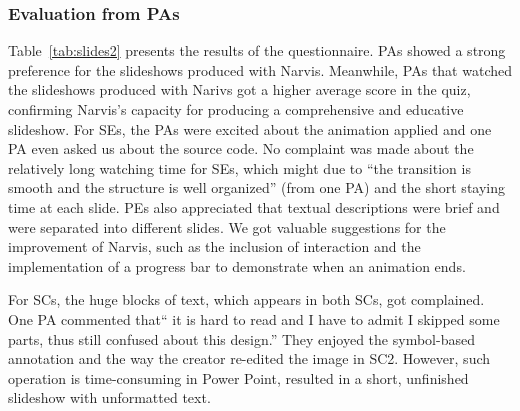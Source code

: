 

\subsubsection{Evaluation from PAs}

Table~\ref{tab:slides2}  presents the results of the questionnaire. PAs showed a strong preference for the slideshows produced with Narvis. Meanwhile,  PAs that watched the slideshows produced with Narivs got a higher average score in the quiz, confirming Narvis's capacity for producing a comprehensive and educative  slideshow. 
For SEs, the PAs were excited about the animation applied and one PA even asked us about the source code. No complaint was made about the relatively long watching time for SEs, which might due to ``the transition is smooth and the structure is well organized'' (from one PA) and the short staying time at each slide. PEs also appreciated that textual descriptions were brief and were separated into different slides.
We got valuable suggestions for the improvement of Narvis, such as the inclusion of interaction and the implementation of a progress bar to demonstrate when an animation ends. 

For SCs, the huge blocks of text, which appears in both SCs, got   complained. 
One PA commented that`` it is hard to read and I have to admit I skipped some parts, thus still confused about this design.'' They enjoyed the symbol-based annotation and the way the creator re-edited the image in SC2. However, such operation is time-consuming in Power Point, resulted in a short, unfinished slideshow with unformatted text. 


